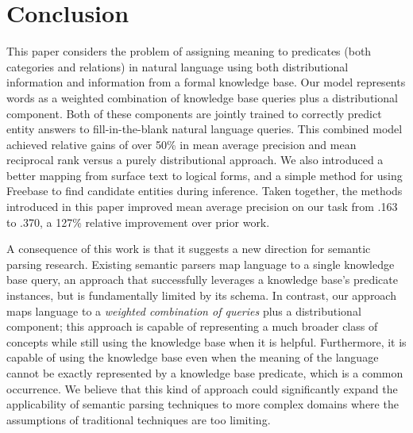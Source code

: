 \documentclass[11pt]{article}
\begin{document}
\section{Conclusion}
\label{sec:conclusion}

This paper considers the problem of assigning meaning to predicates
(both categories and relations) in natural language using both
distributional information and information from a formal knowledge
base. Our model represents words as a weighted combination of
knowledge base queries plus a distributional component. Both of these
components are jointly trained to correctly predict entity answers to
fill-in-the-blank natural language queries. This combined model
achieved relative gains of over 50\% in mean average precision and
mean reciprocal rank versus a purely distributional approach.  We also
introduced a better mapping from surface text to logical forms, and a
simple method for using Freebase to find candidate entities during
inference.  Taken together, the methods introduced in this paper
improved mean average precision on our task from .163 to .370, a 127\%
relative improvement over prior work.

A consequence of this work is that it suggests a new direction for
semantic parsing research. Existing semantic parsers map language to a
single knowledge base query, an approach that successfully leverages a
knowledge base's predicate instances, but is fundamentally limited by
its schema. In contrast, our approach maps language to a
\emph{weighted combination of queries} plus a distributional
component; this approach is capable of representing a much broader
class of concepts while still using the knowledge base when it is
helpful. Furthermore, it is capable of using the knowledge base even
when the meaning of the language cannot be exactly represented by a
knowledge base predicate, which is a common occurrence. We believe
that this kind of approach could significantly expand the
applicability of semantic parsing techniques to more complex domains
where the assumptions of traditional techniques are too limiting.




\end{document}
